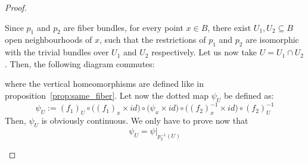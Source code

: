 \begin{proof}
\begin{itemize}
Since $p_1$ and $p_2$ are fiber bundles, for every point $x\in B$, there exist $U_1,U_2\subseteq B$ open neighbourhoods of $x$, such that the restrictions of $p_1$ and $p_2$ are isomorphic with the trivial bundles over $U_1$ and $U_2$ respectively. Let us now take $U=U_1\cap U_2$. Then, the following diagram commutes:
\begin{center}
\end{center}
where the vertical homeomorphisms are defined like in proposition~\ref{prop:same_fiber}. Let now the dotted map $\psi_U$ be defined as:
\[\psi_U:={(f_1)}_U\circ\big({(f_1)}_x\times id\big)\circ\big(\psi_x\times id\big)\circ\big({(f_2)}_x^{-1}\times id\big)\circ{(f_2)}_U^{-1}\]
Then, $\psi_U$ is obviously continuous. We only have to prove now that
\[\psi_U=\left.\psi\right|_{p_2^{-1}(U)}\]







\end{itemize}
\end{proof}







